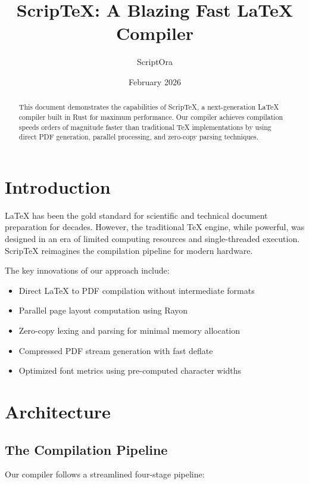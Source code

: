 \documentclass[12pt,a4paper]{article}
\title{ScripTeX: A Blazing Fast LaTeX Compiler}
\author{ScriptOra}
\date{February 2026}
\begin{document}
\maketitle

\begin{abstract}
This document demonstrates the capabilities of ScripTeX, a next-generation LaTeX compiler built in Rust for maximum performance. Our compiler achieves compilation speeds orders of magnitude faster than traditional TeX implementations by using direct PDF generation, parallel processing, and zero-copy parsing techniques.
\end{abstract}

\tableofcontents

\section{Introduction}

LaTeX has been the gold standard for scientific and technical document preparation for decades. However, the traditional TeX engine, while powerful, was designed in an era of limited computing resources and single-threaded execution. ScripTeX reimagines the compilation pipeline for modern hardware.

The key innovations of our approach include:
\begin{itemize}
\item Direct LaTeX to PDF compilation without intermediate formats
\item Parallel page layout computation using Rayon
\item Zero-copy lexing and parsing for minimal memory allocation
\item Compressed PDF stream generation with fast deflate
\item Optimized font metrics using pre-computed character widths
\end{itemize}

\section{Architecture}

\subsection{The Compilation Pipeline}

Our compiler follows a streamlined four-stage pipeline:
\end{document}
